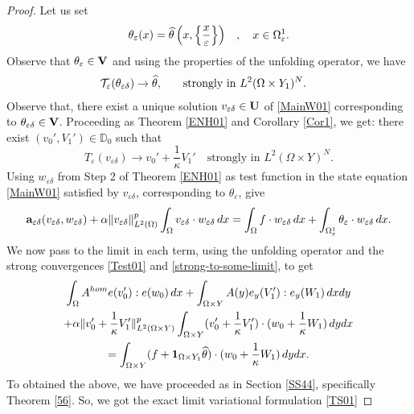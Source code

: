 \documentclass[11pt,a4paper]{article}
\numberwithin{equation}{section}
\def\1{{\bf 1}}
\def\O{\Omega}
\def\d{\delta}
\def\e{\varepsilon}
\def\Te{{\cal T}_\varepsilon}
\def\a{{\alpha}}
\def\Ga{{\bf a}}
\def\D{{\mathbb{D}}}
\def\ed{{\varepsilon\delta}}
\def\wh{\widehat }
\def\X{\times }
\def\Ga{{\bf a}}
\def\GU{{\bf U}}
\def\GV{{\bf V}}
\begin{document}
\begin{proof}
		Let us set
		\begin{equation*}
			\begin{aligned}
				\theta_\e(x)&=\wh\theta\left(x,\left\{x\over \e\right\}\right) 
			\end{aligned},\quad x\in \O^1_\e.
		\end{equation*}
		Observe that $\theta_\e\in\GV$ and using the properties of the unfolding operator, we have
		\begin{equation*}
			\begin{aligned}
				\Te(\theta_\ed)&\to \wh\theta,\quad &&\text{strongly in $L^2(\O\X Y_1)^N$}.
			\end{aligned}
		\end{equation*} 
		Observe that, there exist a unique solution $v_\ed\in\GU$ of \eqref{MainW01} corresponding to $\theta_\ed\in\GV$. Proceeding as Theorem \ref{ENH01} and Corollary \ref{Cor1}, we get: there exist
		$(v_0',V_1')\in\D_0$ such that 
		\begin{equation}\label{strong-to-some-limit}
			T_\e(v_{\e\d})\to v_0'+\frac1\kappa V_1'
			\quad\text{strongly in }L^2(\Omega\times Y)^N.
		\end{equation}
				Using $w_\ed$ from Step 2 of Theorem \ref{ENH01} as test function in the state equation \eqref{MainW01} satisfied by $v_{\e\d}$, corresponding to $\theta_\e$, give
		\begin{equation}\label{weak-eps}
			\Ga_{\e\d}(v_{\e\d},w_\ed)
			+\alpha\|v_{\e\d}\|_{L^2(\Omega)}^{p}\int_\Omega v_{\e\d}\cdot w_\ed\,dx
			=\int_\Omega f\cdot w_\ed\,dx+\int_{\Omega_\e^1}\theta_\e\cdot w_\ed\,dx.
		\end{equation}
				We now pass to the limit in each term, using the unfolding operator and the strong convergences \eqref{Test01} and \eqref{strong-to-some-limit}, to get
			\begin{multline*}	\int_{\O}A^{hom}e(v'_0):e(w_0)\,dx+\int_{\O\X Y}A(y) e_y(V'_1):e_y(W_1)\,dxdy\\
			+\a\|v'_0+{1\over \kappa}V'_1\|^p_{L^2(\O\X Y)}\int_{\O\X Y}(v'_0+{1\over \kappa}V'_1)\cdot (w_0+{1\over \kappa}W_1)\,dydx\\
			=\int_{\O\X Y}(f+\1_{\O\X Y_1}\wh \theta)\cdot (w_0+{1\over \kappa}W_1)\,dydx.
		\end{multline*}
		To obtained the above, we have proceeded as in Section \eqref{SS44}, specifically Theorem \ref{56}. So, we got the exact limit variational formulation \eqref{TS01}

\end{proof}
\end{document}
